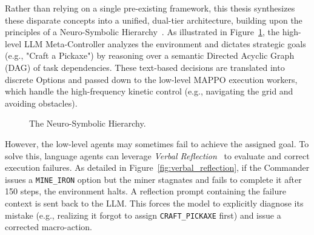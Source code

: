 Rather than relying on a single pre-existing framework, this thesis synthesizes these disparate concepts into a unified, dual-tier architecture, building upon the principles of a Neuro-Symbolic Hierarchy~\parencite{Mitchener_2022}. As illustrated in Figure~\ref{fig:neuro_symbolic_hierarchy}, the high-level LLM Meta-Controller analyzes the environment and dictates strategic goals (e.g., "Craft a Pickaxe") by reasoning over a semantic Directed Acyclic Graph (DAG) of task dependencies. These text-based decisions are translated into discrete Options and passed down to the low-level MAPPO execution workers, which handle the high-frequency kinetic control (e.g., navigating the grid and avoiding obstacles).

\begin{figure}[H]
\centering
{}
\caption{The Neuro-Symbolic Hierarchy.}
\label{fig:neuro_symbolic_hierarchy}
\end{figure}

However, the low-level agents may sometimes fail to achieve the assigned goal. To solve this, language agents can leverage \emph{Verbal Reflection}~\parencite{Shinn_Cassano_Berman_Gopinath_Narasimhan_Yao_2023} to evaluate and correct execution failures. As detailed in Figure~\ref{fig:verbal_reflection}, if the Commander issues a \texttt{MINE\_IRON} option but the miner stagnates and fails to complete it after 150 steps, the environment halts. A reflection prompt containing the failure context is sent back to the LLM. This forces the model to explicitly diagnose its mistake (e.g., realizing it forgot to assign \texttt{CRAFT\_PICKAXE} first) and issue a corrected macro-action. 

